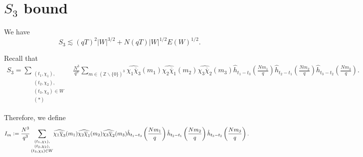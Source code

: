 \section{$S_3$ bound}

\begin{proposition}[$S_3$ bound] \label{s3refined}
  We have
    \[
S_3 \lesssim (qT)^{2}| W|^{3/2}+N(qT)| W|^{1/2}E( W)^{1/2}.
\]
\end{proposition}
Recall that 
\begin{align*}
	S_3 = \sum_{\substack{(t_1,\chi_1),\\(t_2,\chi_2),\\(t_3,\chi_3)\in W \\ (*)}}&
	\frac{N^3}{q^3}\sum_{m\in(\mathbb{Z}\backslash \{0\})^3}\widehat{{\chi_1{\overline{\chi}_3}}}(m_1)\widehat{\chi_2\overline{\chi}_1}(m_2)\widehat{\chi_3\overline{\chi}_2}(m_3) \hat{h}_{t_1-t_3}\left(\frac{Nm_1}{q}\right)\hat{h}_{t_2-t_1}\left(\frac{Nm_2}{q}\right)\hat{h}_{t_3-t_2}\left(\frac{Nm_3}{q}\right).
\end{align*}

Therefore, we define 
\begin{align*}
	I_m\mathrel{\mathop:}=\frac{N^3}{q^3}\sum_{\substack{(t_1,\chi_1),\\(t_2,\chi_2),\\(t_3,\chi_3)\in W}} &\widehat{{\chi_1{\overline{\chi}_3}}}(m_1)\widehat{\chi_2\overline{\chi}_1}(m_2)\widehat{\chi_3\overline{\chi}_2}(m_3) \hat{h}_{t_1-t_3}\left(\frac{Nm_1}{q}\right)\hat{h}_{t_2-t_1}\left(\frac{Nm_2}{q}\right)\hat{h}_{t_3-t_2}\left(\frac{Nm_3}{q}\right).
\end{align*}

